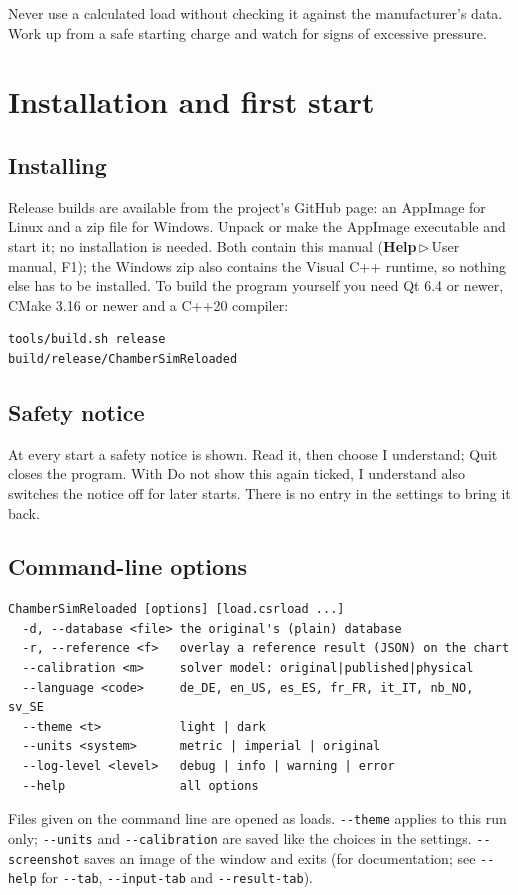 \documentclass[11pt,a4paper]{article}
\newcommand{\ui}[1]{\textsf{#1}}
\newcommand{\menu}[1]{\textsf{\textbf{#1}}}
\newcommand{\sep}{\,$\triangleright$\,}
\begin{document}
\begin{warning}
Never use a calculated load without checking it against the manufacturer's data. Work up from a safe starting charge and watch
for signs of excessive pressure.
\end{warning}

\section{Installation and first start}

\subsection{Installing}
Release builds are available from the project's GitHub page: an AppImage for Linux and a zip file for Windows. Unpack or
make the AppImage executable and start it; no installation is needed. Both contain this manual (\menu{Help}\sep\ui{User manual}, F1); the Windows zip also
contains the Visual C++ runtime, so nothing else has to be installed.
To build the program yourself you need Qt 6.4 or newer, CMake 3.16 or newer and a C++20 compiler:
\begin{verbatim}
tools/build.sh release
build/release/ChamberSimReloaded
\end{verbatim}

\subsection{Safety notice}
At every start a safety notice is shown. Read it, then choose \ui{I understand}; \ui{Quit} closes the program. With \ui{Do not show this again}
ticked, \ui{I understand} also switches the notice off for later starts. There is no entry in the settings to bring it back.

\subsection{Command-line options}
\begin{verbatim}
ChamberSimReloaded [options] [load.csrload ...]
  -d, --database <file> the original's (plain) database
  -r, --reference <f>   overlay a reference result (JSON) on the chart
  --calibration <m>     solver model: original|published|physical
  --language <code>     de_DE, en_US, es_ES, fr_FR, it_IT, nb_NO, sv_SE
  --theme <t>           light | dark
  --units <system>      metric | imperial | original
  --log-level <level>   debug | info | warning | error
  --help                all options
\end{verbatim}
Files given on the command line are opened as loads. \texttt{-{}-theme} applies to this run only; \texttt{-{}-units} and \texttt{-{}-calibration}
are saved like the choices in the settings. \texttt{-{}-screenshot} saves an image of the window and exits (for documentation; see \texttt{-{}-help} for
\texttt{-{}-tab}, \texttt{-{}-input-tab} and \texttt{-{}-result-tab}).
\end{document}
